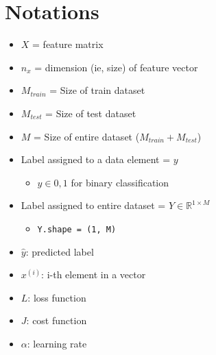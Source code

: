 \documentclass{article}
\newcommand\code[1]{\texttt{#1}}
\begin{document}
\section{Notations}
\begin{itemize}
  \item $X$ = feature matrix
  \item $n_x$ = dimension (ie, size) of feature vector
  \item $M_{train}$ = Size of train dataset
  \item $M_{test}$ = Size of test dataset
  \item $M$ = Size of entire dataset ($M_{train} + M_{test}$)
  \item Label assigned to a data element = $y$
  \begin{itemize}
    \item $y \in {0,1}$ for binary classification
  \end{itemize}
  \item Label assigned to entire dataset = $Y \in \mathbb{R}^{1 \times M}$
  \begin{itemize}
    \item \code{Y.shape = (1, M)}
  \end{itemize}
  \item $\hat{y}$: predicted label
  \item $x^{(i)}$: i-th element in a vector
  \item $L$: loss function
  \item $J$: cost function
  \item $\alpha$: learning rate
\end{itemize}
\end{document}

